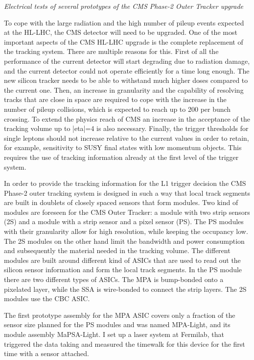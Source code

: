 \documentclass[]{cv} %
\begin{document}
\begin{statement}
\vspace{15pt}
\Large{}
\textit{Electrical tests of several prototypes of the CMS Phase-2 Outer Tracker upgrade}
\normalsize{}

To cope with the large radiation and the high number of pileup events expected
at the HL-LHC, the CMS detector will need to be upgraded. One of the most
important aspects of the CMS HL-LHC upgrade is the complete replacement of the
tracking system. There are multiple reasons for this. First of all the
performance of the current detector will start degrading due to radiation
damage, and the current detector could not operate efficiently for a time long
enough. The new silicon tracker needs to be able to withstand much higher doses
compared to the current one. Then, an increase in granularity and the capability
of resolving tracks that are close in space are required to cope with the
increase in the number of pileup collisions, which is expected to reach up to
200 per bunch crossing. To extend the physics reach of CMS an increase in the
acceptance of the tracking volume up to |eta|=4 is also necessary. Finally, the
trigger thresholds for single leptons should not increase relative to the
current values in order to retain, for example, sensitivity to SUSY final states
with low momentum objects. This requires the use of tracking information already
at the first level of the trigger system.

In order to provide the tracking information for the L1 trigger decision the CMS
Phase-2 outer tracking system is designed in such a way that local track
segments are built in doublets of closely spaced sensors that form modules. Two
kind of modules are foreseen for the CMS Outer Tracker: a module with two strip
sensors (2S) and a module with a strip sensor and a pixel sensor (PS). The PS
modules with their granularity allow for high resolution, while keeping the
occupancy low. The 2S modules on the other hand limit the bandwidth and power
consumption and subsequently the material needed in the tracking volume. The
different modules are built around different kind of ASICs that are used to read
out the silicon sensor information and form the local track segments. In the PS
module there are two different types of ASICs. The MPA is bump-bonded onto a
pixelated layer, while the SSA is wire-bonded to connect the strip layers. The
2S modules use the CBC ASIC.

The first prototype assembly for the MPA ASIC covers only a fraction of the
sensor size planned for the PS modules and was named MPA-Light, and its module
assembly MaPSA-Light. I set up a laser system at Fermilab, that triggered the
data taking and measured the timewalk for this device for the first time with a
sensor attached.


\end{statement}
\end{document}
